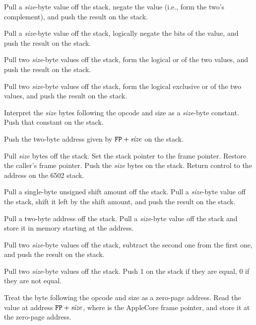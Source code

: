 \documentclass[10pt]{article}
\begin{document}
 Pull a \emph{size}-byte
value off the stack, negate the value (i.e., form the two's
complement), and push the result on the stack.

 Pull a \emph{size}-byte value
off the stack, logically negate the bits of the value, and push the
result on the stack.

 Pull two
\emph{size}-byte values off the stack, form the logical or of the two
values, and push the result on the stack.

 Pull two
\emph{size}-byte values off the stack, form the logical exclusive or
of the two values, and push the result on the stack.

Interpret the \emph{size} bytes following the opcode and size
as a \emph{size}-byte constant.  Push that constant on the
stack.

Push the two-byte address given by $\texttt{FP}+\mbox{\textit{size}}$ on
the stack.

Pull \emph{size} bytes off the stack.  Set the stack pointer to the
frame pointer.  Restore the caller's frame pointer.  Push the
\emph{size} bytes on the stack.  Return control to the address on the
6502 stack.

 Pull a single-byte
unsigned shift amount off the stack.  Pull a \emph{size}-byte value
off the stack, shift it left by the shift amount, and push the result
on the stack.

Pull a two-byte address off the stack.  Pull a \emph{size}-byte
value off the stack and store it in memory starting at the
address.

Pull two \emph{size}-byte values off the stack, subtract the
second one from the first one, and push the result on the stack.

Pull two \emph{size}-byte values off the stack. Push 1 on the stack
if they are equal, 0 if they are not equal.

Treat the byte following the opcode and size as a zero-page
address.  Read the value at address $\texttt{FP}+\mbox{\textit{size}}$, 
where  is the AppleCore frame pointer, and store
it at the zero-page address.
\end{document}

